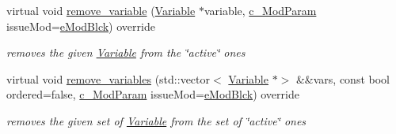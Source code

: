 \begin{Indent}
\begin{DoxyCompactItemize}
virtual void \mbox{\hyperlink{class_s_m_spp__di__unipi__it_1_1_one_var_constraint_ade52d9ebf47de895377b860ef4d3a607}{remove\+\_\+variable}} (\mbox{\hyperlink{class_s_m_spp__di__unipi__it_1_1_variable}{Variable}} $\ast$variable, \mbox{\hyperlink{group___modification___t_y_p_e_s_ga544246d8c462e9a2d817c2c30797968f}{c\+\_\+\+Mod\+Param}} issue\+Mod=\mbox{\hyperlink{group___modification___t_y_p_e_s_gga48fddcdd03a03f49b7e389ca1ed938d4a21b14b26b1c0093a0905f6fc010bad29}{e\+Mod\+Blck}}) override
\begin{DoxyCompactList}\small\item\em removes the given \mbox{\hyperlink{class_s_m_spp__di__unipi__it_1_1_variable}{Variable}} from the \char`\"{}active\char`\"{} ones \end{DoxyCompactList}\item 
virtual void \mbox{\hyperlink{class_s_m_spp__di__unipi__it_1_1_one_var_constraint_a46c11bb15648f9976eee469c53099b11}{remove\+\_\+variables}} (std\+::vector$<$ \mbox{\hyperlink{class_s_m_spp__di__unipi__it_1_1_variable}{Variable}} $\ast$$>$ \&\&vars, const bool ordered=false, \mbox{\hyperlink{group___modification___t_y_p_e_s_ga544246d8c462e9a2d817c2c30797968f}{c\+\_\+\+Mod\+Param}} issue\+Mod=\mbox{\hyperlink{group___modification___t_y_p_e_s_gga48fddcdd03a03f49b7e389ca1ed938d4a21b14b26b1c0093a0905f6fc010bad29}{e\+Mod\+Blck}}) override
\begin{DoxyCompactList}\small\item\em removes the given set of \mbox{\hyperlink{class_s_m_spp__di__unipi__it_1_1_variable}{Variable}} from the set of \char`\"{}active\char`\"{} ones \end{DoxyCompactList}\end{DoxyCompactItemize}
\end{Indent}
